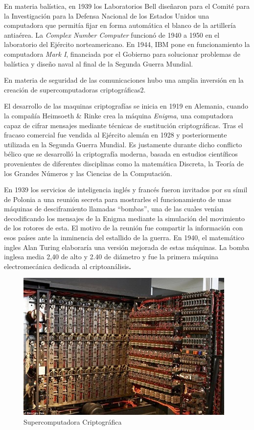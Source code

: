 \documentclass[
  letterpaper,
  DIV=11,
  numbers=noendperiod]{scrreprt}
\begin{document}
En materia balística, en 1939 los Laboratorios Bell diseñaron para el
Comité para la Investigación para la Defensa Nacional de los Estados
Unidos una computadora que permitía fijar en forma automática el blanco
de la artillería antiaérea. La \emph{Complex Number Computer} funcionó
de 1940 a 1950 en el laboratorio del Ejército norteamericano. En 1944,
IBM pone en funcionamiento la computadora \emph{Mark I}, financiada por
el Gobierno para solucionar problemas de balística y diseño naval al
final de la Segunda Guerra Mundial.

En materia de seguridad de las comunicaciones hubo una amplia inversión
en la creación de supercomputadoras criptográficas2.

El desarrollo de las maquinas criptografías se inicia en 1919 en
Alemania, cuando la compañía Heimsoeth \& Rinke crea la máquina
\emph{Enigma}, una computadora capaz de cifrar mensajes mediante
técnicas de sustitución criptográficas. Tras el fracaso comercial fue
vendida al Ejército alemán en 1928 y posteriormente utilizada en la
Segunda Guerra Mundial. Es justamente durante dicho conflicto bélico que
se desarrolló la criptografía moderna, basada en estudios científicos
provenientes de diferentes disciplinas como la matemática Discreta, la
Teoría de los Grandes Números y las Ciencias de la Computación.

En 1939 los servicios de inteligencia inglés y francés fueron invitados
por su símil de Polonia a una reunión secreta para mostrarles el
funcionamiento de unas máquinas de desciframiento llamadas ``bombas'',
una de las cuales venían decodificando los mensajes de la Enigma
mediante la simulación del movimiento de los rotores de esta. El motivo
de la reunión fue compartir la información con esos países ante la
inminencia del estallido de la guerra. En 1940, el matemático ingles
Alan Turing elaboraría una versión mejorada de estas máquinas. La bomba
inglesa media 2,40 de alto y 2.40 de diámetro y fue la primera máquina
electromecánica dedicada al criptoanálisis\textbf{.}

\begin{figure}[H]

{\centering \includegraphics{images_2_cap/4-primeras-supercomputadoras.jpg}

}

\caption{Supercomputadora Criptográfica}

\end{figure}%
\end{document}
